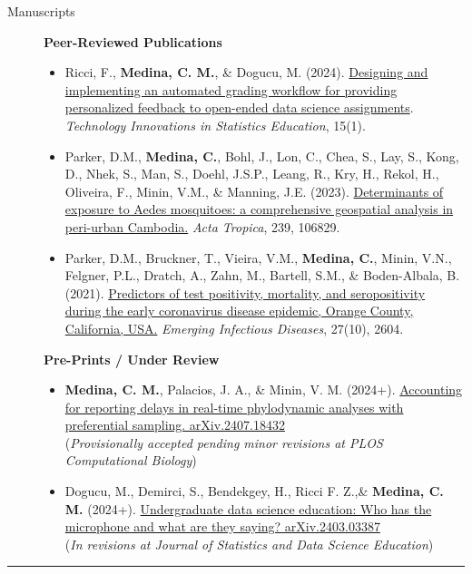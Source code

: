 \documentclass{article}
\begin{document}
	\begin{description}
		\vspace{-2mm}
		
		\item[Manuscripts] \hspace*{.1in} 
		
		\textbf{Peer-Reviewed Publications}
		\begin{itemize}
			\item Ricci, F., \textbf{Medina, C. M.}, \& Dogucu, M. (2024). \href{https://doi.org/10.5070/T5.1886}{Designing and implementing an automated grading workflow for providing personalized feedback to open-ended data science assignments}. \textit{Technology Innovations in Statistics Education}, 15(1).
			
			\item Parker, D.M., \textbf{Medina, C.}, Bohl, J., Lon, C., Chea, S., Lay, S., Kong, D., Nhek, S., Man, S., Doehl, J.S.P., Leang, R., Kry, H., Rekol, H., Oliveira, F., Minin, V.M., \& Manning, J.E. (2023). \href{https://doi.org/10.1016/j.actatropica.2023.106829}{Determinants of exposure to Aedes mosquitoes: a comprehensive geospatial analysis in peri-urban Cambodia.} \textit{Acta Tropica}, 239, 106829. 
			
			\item Parker, D.M., Bruckner, T., Vieira, V.M., \textbf{Medina, C.}, Minin, V.N., Felgner, P.L., Dratch, A., Zahn, M., Bartell, S.M., \& Boden-Albala, B. (2021). \href{https://doi.org/10.3201/eid2710.210103}{Predictors of test positivity, mortality, and seropositivity during the early coronavirus disease epidemic, Orange County, California, USA.} \textit{Emerging Infectious Diseases}, 27(10), 2604.
		\end{itemize}	
		
		\textbf{Pre-Prints / Under Review}
		\begin{itemize}
			\item \textbf{Medina, C. M.}, Palacios, J. A., \& Minin, V. M. (2024+). \href{https://doi.org/10.48550/arXiv.2407.18432}{Accounting for reporting delays in real-time phylodynamic analyses with preferential sampling. arXiv.2407.18432}\\ (\textit{Provisionally accepted pending minor revisions at PLOS Computational Biology})
			
			\item Dogucu, M., Demirci, S., Bendekgey, H., Ricci F. Z.,\& \textbf{Medina, C. M.} (2024+). \href{https://doi.org/10.48550/arXiv.2403.03387}{Undergraduate data science education: Who has the microphone and what are they saying? arXiv.2403.03387}\\ (\textit{In revisions at Journal of Statistics and Data Science Education})
		\end{itemize}
		
	\end{description}
	\vspace{-2mm}
	\rule{\linewidth}{1pt}
	
\end{document}
